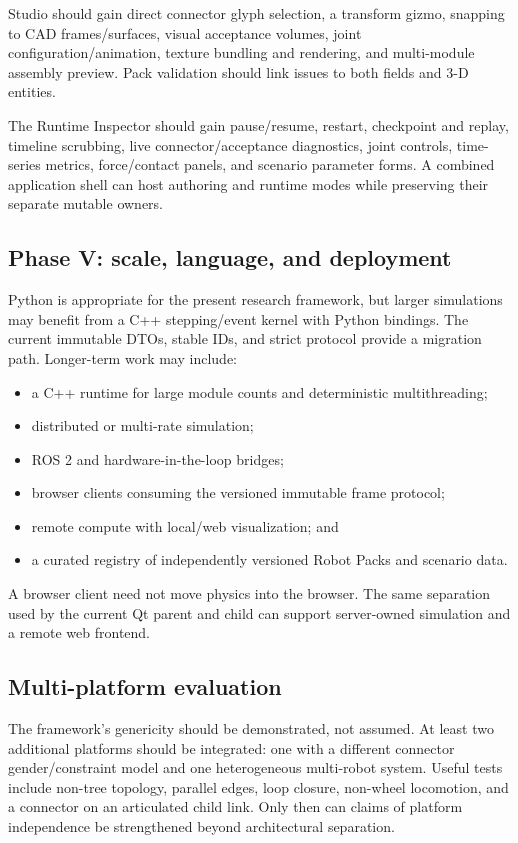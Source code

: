 Studio should gain direct connector glyph selection, a transform gizmo, snapping to CAD
frames/surfaces, visual acceptance volumes, joint configuration/animation, texture
bundling and rendering, and multi-module assembly preview. Pack validation should link
issues to both fields and 3-D entities.

The Runtime Inspector should gain pause/resume, restart, checkpoint and replay, timeline
scrubbing, live connector/acceptance diagnostics, joint controls, time-series metrics,
force/contact panels, and scenario parameter forms. A combined application shell can
host authoring and runtime modes while preserving their separate mutable owners.

\subsection{Phase V: scale, language, and deployment}

Python is appropriate for the present research framework, but larger simulations may
benefit from a C++ stepping/event kernel with Python bindings. The current immutable
DTOs, stable IDs, and strict protocol provide a migration path. Longer-term work may
include:

\begin{itemize}
  \item a C++ runtime for large module counts and deterministic multithreading;
  \item distributed or multi-rate simulation;
  \item ROS 2 and hardware-in-the-loop bridges;
  \item browser clients consuming the versioned immutable frame protocol;
  \item remote compute with local/web visualization; and
  \item a curated registry of independently versioned Robot Packs and scenario data.
\end{itemize}

A browser client need not move physics into the browser. The same separation used by
the current Qt parent and \mujoco{} child can support server-owned simulation and a
remote web frontend.

\subsection{Multi-platform evaluation}

The framework's genericity should be demonstrated, not assumed. At least two additional
platforms should be integrated: one with a different connector gender/constraint model
and one heterogeneous multi-robot system. Useful tests include non-tree topology,
parallel edges, loop closure, non-wheel locomotion, and a connector on an articulated
child link. Only then can claims of platform independence be strengthened beyond
architectural separation.


